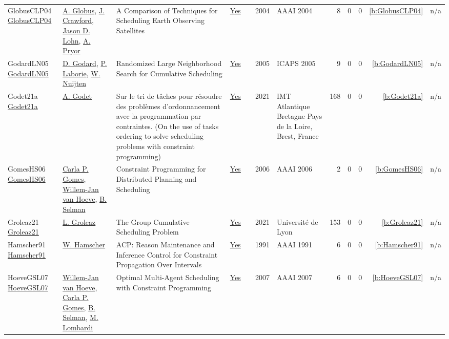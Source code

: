 {\begin{longtable}{>{\raggedright\arraybackslash}p{3cm}>{\raggedright\arraybackslash}p{6cm}>{\raggedright\arraybackslash}p{6.5cm}rrrp{2.5cm}rrrrr}
GlobusCLP04 \href{}{GlobusCLP04} & \hyperref[auth:a1361]{A. Globus}, \hyperref[auth:a1362]{J. Crawford}, \hyperref[auth:a1363]{Jason D. Lohn}, \hyperref[auth:a1364]{A. Pryor} & A Comparison of Techniques for Scheduling Earth Observing Satellites & \href{../works/GlobusCLP04.pdf}{Yes} & \cite{GlobusCLP04} & 2004 & AAAI 2004 & 8 & 0 & 0 & \ref{b:GlobusCLP04} & n/a\\
GodardLN05 \href{http://www.aaai.org/Library/ICAPS/2005/icaps05-009.php}{GodardLN05} & \hyperref[auth:a780]{D. Godard}, \hyperref[auth:a118]{P. Laborie}, \hyperref[auth:a662]{W. Nuijten} & Randomized Large Neighborhood Search for Cumulative Scheduling & \href{../works/GodardLN05.pdf}{Yes} & \cite{GodardLN05} & 2005 & ICAPS 2005 & 9 & 0 & 0 & \ref{b:GodardLN05} & n/a\\
Godet21a \href{https://tel.archives-ouvertes.fr/tel-03681868}{Godet21a} & \hyperref[auth:a474]{A. Godet} & Sur le tri de t{\^{a}}ches pour r{\'{e}}soudre des probl{\`{e}}mes d'ordonnancement avec la programmation par contraintes. (On the use of tasks ordering to solve scheduling problems with constraint programming) & \href{../works/Godet21a.pdf}{Yes} & \cite{Godet21a} & 2021 & {IMT} Atlantique Bretagne Pays de la Loire, Brest, France & 168 & 0 & 0 & \ref{b:Godet21a} & n/a\\
GomesHS06 \href{http://www.aaai.org/Library/Symposia/Spring/2006/ss06-04-024.php}{GomesHS06} & \hyperref[auth:a648]{Carla P. Gomes}, \hyperref[auth:a211]{Willem{-}Jan van Hoeve}, \hyperref[auth:a649]{B. Selman} & Constraint Programming for Distributed Planning and Scheduling & \href{../works/GomesHS06.pdf}{Yes} & \cite{GomesHS06} & 2006 & AAAI 2006 & 2 & 0 & 0 & \ref{b:GomesHS06} & n/a\\
Groleaz21 \href{https://hal.science/tel-03266690}{Groleaz21} & \hyperref[auth:a83]{L. Groleaz} & {The Group Cumulative Scheduling Problem} & \href{../works/Groleaz21.pdf}{Yes} & \cite{Groleaz21} & 2021 & {Universit{\'e} de Lyon} & 153 & 0 & 0 & \ref{b:Groleaz21} & n/a\\
Hamscher91 \href{http://www.aaai.org/Library/AAAI/1991/aaai91-079.php}{Hamscher91} & \hyperref[auth:a1299]{W. Hamscher} & {ACP:} Reason Maintenance and Inference Control for Constraint Propagation Over Intervals & \href{../works/Hamscher91.pdf}{Yes} & \cite{Hamscher91} & 1991 & AAAI 1991 & 6 & 0 & 0 & \ref{b:Hamscher91} & n/a\\
HoeveGSL07 \href{http://www.aaai.org/Library/AAAI/2007/aaai07-291.php}{HoeveGSL07} & \hyperref[auth:a211]{Willem{-}Jan van Hoeve}, \hyperref[auth:a648]{Carla P. Gomes}, \hyperref[auth:a649]{B. Selman}, \hyperref[auth:a143]{M. Lombardi} & Optimal Multi-Agent Scheduling with Constraint Programming & \href{../works/HoeveGSL07.pdf}{Yes} & \cite{HoeveGSL07} & 2007 & AAAI 2007 & 6 & 0 & 0 & \ref{b:HoeveGSL07} & n/a\\

\end{longtable}}
